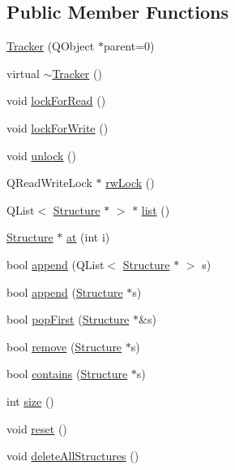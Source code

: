 \subsection*{Public Member Functions}
\begin{DoxyCompactItemize}
\item 
\hyperlink{classGlobalSearch_1_1Tracker_ae61188a8f66c57cc303a823da6130f25}{Tracker} (Q\+Object $\ast$parent=0)
\item 
virtual \hyperlink{classGlobalSearch_1_1Tracker_a231c0a58d7023188e0b9118924fac506}{$\sim$\+Tracker} ()
\item 
void \hyperlink{classGlobalSearch_1_1Tracker_afa0bbd85ec04527c7919a29746e235e4}{lock\+For\+Read} ()
\item 
void \hyperlink{classGlobalSearch_1_1Tracker_aba8064ec469694aa7207b734ac075fad}{lock\+For\+Write} ()
\item 
void \hyperlink{classGlobalSearch_1_1Tracker_a3c30e04b28dd39ddeff887d3bf4e812a}{unlock} ()
\item 
Q\+Read\+Write\+Lock $\ast$ \hyperlink{classGlobalSearch_1_1Tracker_a4aa19e3357f6803957c5646c4bb8f530}{rw\+Lock} ()
\item 
Q\+List$<$ \hyperlink{classGlobalSearch_1_1Structure}{Structure} $\ast$ $>$ $\ast$ \hyperlink{classGlobalSearch_1_1Tracker_a2d8fc282ef5d400a48f5afb931eeba8b}{list} ()
\item 
\hyperlink{classGlobalSearch_1_1Structure}{Structure} $\ast$ \hyperlink{classGlobalSearch_1_1Tracker_ab1457df5dea634a1f9b482cab0c8edb0}{at} (int i)
\item 
bool \hyperlink{classGlobalSearch_1_1Tracker_aebafa2ceea4e665f2660917eb18eb4b5}{append} (Q\+List$<$ \hyperlink{classGlobalSearch_1_1Structure}{Structure} $\ast$ $>$ s)
\item 
bool \hyperlink{classGlobalSearch_1_1Tracker_a1b1705061e58e92e1650e91cb44a07f6}{append} (\hyperlink{classGlobalSearch_1_1Structure}{Structure} $\ast$s)
\item 
bool \hyperlink{classGlobalSearch_1_1Tracker_a7e022f8bd6943c5eb0651f81ce369793}{pop\+First} (\hyperlink{classGlobalSearch_1_1Structure}{Structure} $\ast$\&s)
\item 
bool \hyperlink{classGlobalSearch_1_1Tracker_ad8a31bd3a5185e88157b3a61fdf48a27}{remove} (\hyperlink{classGlobalSearch_1_1Structure}{Structure} $\ast$s)
\item 
bool \hyperlink{classGlobalSearch_1_1Tracker_aa6feecde63a4483355a3672e1dd137dc}{contains} (\hyperlink{classGlobalSearch_1_1Structure}{Structure} $\ast$s)
\item 
int \hyperlink{classGlobalSearch_1_1Tracker_a3670df88ce17cde7984de8cf72ed189b}{size} ()
\item 
void \hyperlink{classGlobalSearch_1_1Tracker_a585a3720623c0df6f793e7b1b8fc586b}{reset} ()
\item 
void \hyperlink{classGlobalSearch_1_1Tracker_a29171b414ff3092c73113565e838bcc1}{delete\+All\+Structures} ()
\end{DoxyCompactItemize}


